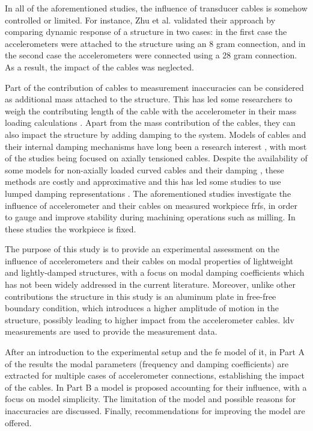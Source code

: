 In all of the aforementioned studies, the influence of transducer cables is somehow controlled or limited. For instance, Zhu et al. validated their approach by comparing dynamic response of a structure in two cases: in the first case the accelerometers were attached to the structure using an 8 gram connection, and in the second case the accelerometers were connected using a 28 gram connection. As a result, the impact of the cables was neglected.

Part of the contribution of cables to measurement inaccuracies can be considered as additional mass attached to the structure. This has led some researchers to weigh the contributing length of the cable with the accelerometer in their mass loading calculations \cite{kiran_compensation_2017}. Apart from the mass contribution of the cables, they can also impact the structure by adding damping to the system. Models of cables and their internal damping mechanisms have long been a research interest \cite{spak_cable_2013}, with most of the studies being focused on axially tensioned cables. Despite the availability of some models for non-axially loaded curved cables and their damping \cite{otrin_damped_2007}, these methods are costly and approximative and this has led some studies to use lumped damping representations \cite{kiran_compensation_2017,olvera_improved_2016}. The aforementioned studies investigate the influence of accelerometer and their cables on measured workpiece \glspl{frf}, in order to gauge and improve stability during machining operations such as milling. In these studies the workpiece is fixed.

The purpose of this study is to provide an experimental assessment on the influence of accelerometers and their cables on modal properties of lightweight and lightly-damped structures, with a focus on modal damping coefficients which has not been widely addressed in the current literature. Moreover, unlike other contributions the structure in this study is an aluminum plate in free-free boundary condition, which introduces a higher amplitude of motion in the structure, possibly leading to higher impact from the accelerometer cables. \gls{ldv} measurements are used to provide the measurement data.

After an introduction to the experimental setup and the \gls{fe} model of it, in Part A of the results the modal parameters (frequency and damping coefficients) are extracted for multiple cases of accelerometer connections, establishing the impact of the cables. In Part B a model is proposed accounting for their influence, with a focus on model simplicity. The limitation of the model and possible reasons for inaccuracies are discussed. Finally, recommendations for improving the model are offered.

